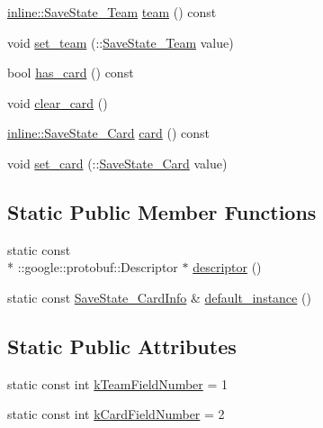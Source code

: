 \begin{DoxyCompactItemize}
\item 
\hyperlink{savestate_8pb_8h_a4b014fc7586e8ed50211fe26dace5b8c}{inline\-::\-Save\-State\-\_\-\-Team} \hyperlink{class_save_state___card_info_a5dc4c2fe156f8098143d43874e48eef1}{team} () const 
\item 
void \hyperlink{class_save_state___card_info_acadb685eefc36ddd831b9650b593ac92}{set\-\_\-team} (\-::\hyperlink{savestate_8pb_8h_a4b014fc7586e8ed50211fe26dace5b8c}{Save\-State\-\_\-\-Team} value)
\item 
bool \hyperlink{class_save_state___card_info_a8086b91f08f165c6b022b3e4ff87dad1}{has\-\_\-card} () const 
\item 
void \hyperlink{class_save_state___card_info_a57e9a8e9d59fdc6b2fab17cc45871375}{clear\-\_\-card} ()
\item 
\hyperlink{savestate_8pb_8h_a3d0d776b2483d298617cad1c15956ec7}{inline\-::\-Save\-State\-\_\-\-Card} \hyperlink{class_save_state___card_info_a01b61818c10e0a32e5ed29e11f98a4c1}{card} () const 
\item 
void \hyperlink{class_save_state___card_info_af0fdab672710bf94330b4e152c104130}{set\-\_\-card} (\-::\hyperlink{savestate_8pb_8h_a3d0d776b2483d298617cad1c15956ec7}{Save\-State\-\_\-\-Card} value)
\end{DoxyCompactItemize}
\subsection*{Static Public Member Functions}
\begin{DoxyCompactItemize}
\item 
static const \\*
\-::google\-::protobuf\-::\-Descriptor $\ast$ \hyperlink{class_save_state___card_info_af88b485de235b3512e4b02d2754d41e2}{descriptor} ()
\item 
static const \hyperlink{class_save_state___card_info}{Save\-State\-\_\-\-Card\-Info} \& \hyperlink{class_save_state___card_info_a8b564a4191d261aabd52a0f4e94f16ad}{default\-\_\-instance} ()
\end{DoxyCompactItemize}
\subsection*{Static Public Attributes}
\begin{DoxyCompactItemize}
\item 
static const int \hyperlink{class_save_state___card_info_a29ffc3e5f865e7a85e71d61ba888124b}{k\-Team\-Field\-Number} = 1
\item 
static const int \hyperlink{class_save_state___card_info_a5675958e0483f17f55390916ec5fbacc}{k\-Card\-Field\-Number} = 2
\end{DoxyCompactItemize}
